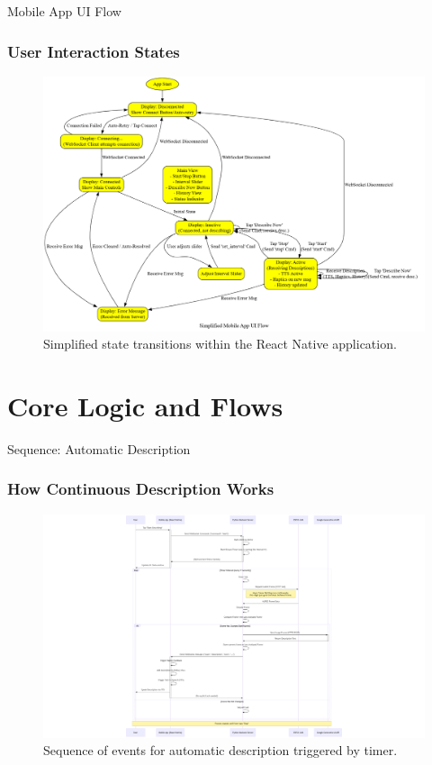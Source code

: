 \documentclass{beamer}
\begin{document}
\begin{frame}{Mobile App UI Flow}
    \frametitle{User Interaction States}
     \begin{figure}
        \centering
        \includegraphics[height=0.8\textheight, width=\textwidth, keepaspectratio]{Mobile_App_UI_Flow_Diagram.png} %
        \caption{Simplified state transitions within the React Native application.}
    \end{figure}
\end{frame}

\section{Core Logic and Flows}

\begin{frame}{Sequence: Automatic Description}
    \frametitle{How Continuous Description Works}
    \begin{figure}
        \centering
        \includegraphics[width=\textwidth, height=0.8\textheight, keepaspectratio]{sequenceDiagram.png}
        \caption{Sequence of events for automatic description triggered by timer.}
    \end{figure}
\end{frame}
\end{document}
